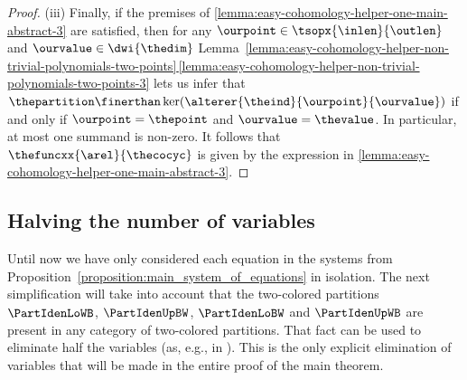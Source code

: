 \documentclass[pdftex]{sigma}
\numberwithin{equation}{section}
\begin{document}
{\begin{proof}
      (iii)
Finally, if the premises of  \ref{lemma:easy-cohomology-helper-one-main-abstract-3} are satisfied, then  for any $\ourpoint\in\tsopx{\inlen}{\outlen}$ and  $\ourvalue\in\dwi{\thedim}$  Lem\-ma~\hyperref[lemma:easy-cohomology-helper-non-trivial-polynomials-two-points-3]{\ref*{lemma:easy-cohomology-helper-non-trivial-polynomials-two-points}\,\ref*{lemma:easy-cohomology-helper-non-trivial-polynomials-two-points-3}} lets us infer   that $\thepartition\finerthan\ker(\alterer{\theind}{\ourpoint}{\ourvalue})$ if and only if $\ourpoint=\thepoint$ and $\ourvalue=\thevalue$. In particular, at most one summand is non-zero. It follows that $\thefuncxx{\arel}{\thecocyc}$ is given by the expression in \ref{lemma:easy-cohomology-helper-one-main-abstract-3}.
  \end{proof}
}


\subsection{Halving the number of variables}
Until now we have only considered each equation in the systems from Pro\-po\-si\-tion~\ref{proposition:main_system_of_equations} in isolation. The next simplification will take into account that
the two-colored partitions  $\PartIdenLoWB$, $\PartIdenUpBW$, $\PartIdenLoBW$ and $\PartIdenUpWB$ are present in any category of two-colored partitions. That fact can be used to eliminate half the variables (as, e.g., in \cite[Lemma~1.7]{KyedRaum2017}). This is the only explicit elimination of variables that will be made in the entire proof of the main theorem.
\end{document}
